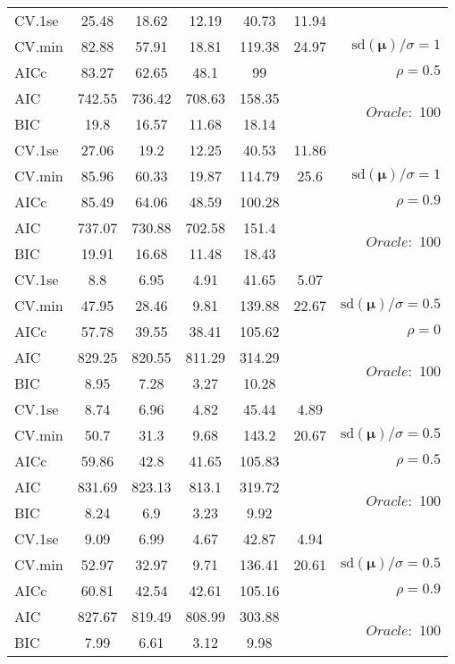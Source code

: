 \begin{table}
\begin{center}
\begin{tabular}{l*{5}{c}|r}
 \hline 
CV.1se & 25.48 & 18.62 & 12.19 & 40.73 & 11.94 & \\
CV.min & 82.88 & 57.91 & 18.81 & 119.38 & 24.97 &  $\mathrm{sd}(\mathbf{\mu})/\sigma=1$ \\
AICc & 83.27 & 62.65 & 48.1 & 99 & & $\rho=0.5$ \\
AIC & 742.55 & 736.42 & 708.63 & 158.35 & &  \multirow{2}{*}{$Oracle: $ 100} \\
BIC & 19.8 & 16.57 & 11.68 & 18.14 & &  \\
 \hline 
CV.1se & 27.06 & 19.2 & 12.25 & 40.53 & 11.86 & \\
CV.min & 85.96 & 60.33 & 19.87 & 114.79 & 25.6 &  $\mathrm{sd}(\mathbf{\mu})/\sigma=1$ \\
AICc & 85.49 & 64.06 & 48.59 & 100.28 & & $\rho=0.9$ \\
AIC & 737.07 & 730.88 & 702.58 & 151.4 & &  \multirow{2}{*}{$Oracle: $ 100} \\
BIC & 19.91 & 16.68 & 11.48 & 18.43 & &  \\
 \hline 
CV.1se & 8.8 & 6.95 & 4.91 & 41.65 & 5.07 & \\
CV.min & 47.95 & 28.46 & 9.81 & 139.88 & 22.67 &  $\mathrm{sd}(\mathbf{\mu})/\sigma=0.5$ \\
AICc & 57.78 & 39.55 & 38.41 & 105.62 & & $\rho=0$ \\
AIC & 829.25 & 820.55 & 811.29 & 314.29 & &  \multirow{2}{*}{$Oracle: $ 100} \\
BIC & 8.95 & 7.28 & 3.27 & 10.28 & &  \\
 \hline 
CV.1se & 8.74 & 6.96 & 4.82 & 45.44 & 4.89 & \\
CV.min & 50.7 & 31.3 & 9.68 & 143.2 & 20.67 &  $\mathrm{sd}(\mathbf{\mu})/\sigma=0.5$ \\
AICc & 59.86 & 42.8 & 41.65 & 105.83 & & $\rho=0.5$ \\
AIC & 831.69 & 823.13 & 813.1 & 319.72 & &  \multirow{2}{*}{$Oracle: $ 100} \\
BIC & 8.24 & 6.9 & 3.23 & 9.92 & &  \\
 \hline 
CV.1se & 9.09 & 6.99 & 4.67 & 42.87 & 4.94 & \\
CV.min & 52.97 & 32.97 & 9.71 & 136.41 & 20.61 &  $\mathrm{sd}(\mathbf{\mu})/\sigma=0.5$ \\
AICc & 60.81 & 42.54 & 42.61 & 105.16 & & $\rho=0.9$ \\
AIC & 827.67 & 819.49 & 808.99 & 303.88 & &  \multirow{2}{*}{$Oracle: $ 100} \\
BIC & 7.99 & 6.61 & 3.12 & 9.98 & &  \\
 \hline 
\end{tabular}
\end{center}
\vspace{-1cm}
\end{table}




